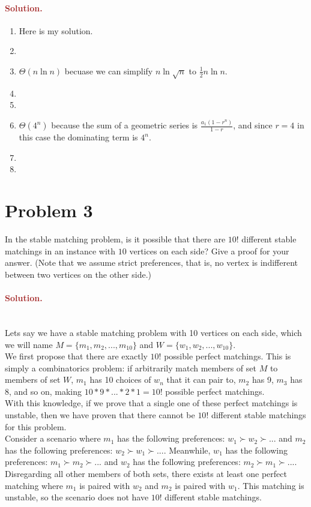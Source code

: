 \paragraph{\textcolor{brown}{Solution.}}
\begin{enumerate}
    \item Here is my solution.
    \item 
    \item $\Theta(n \ln n)$ becuase we can simplify $n \ln \sqrt{n}$ to $\frac{1}{2} n \ln n$.
    \item 
    \item
    \item $\Theta(4^n)$ because the sum of a geometric series is $\frac{a_1(1-r^n)}{1-r}$, and since $r = 4$ in this case the dominating term is $4^n$.
    \item 
    \item 
\end{enumerate}

\section*{Problem 3}
In the stable matching problem, is it possible that there are $10!$ different stable matchings in an instance with $10$ vertices on each side? Give a proof for your answer. (Note that we assume strict preferences, that is, no vertex is indifferent between two vertices on the other side.)

\paragraph{\textcolor{brown}{Solution.}} \: \\
Lets say we have a stable matching problem with 10 vertices on each side, which we will name $M=\{m_1, m_2, ..., m_{10}\}$ and $W=\{w_1, w_2, ..., w_{10}\}$. 
\\We first propose that there are exactly $10!$ possible perfect matchings. This is simply a combinatorics problem: if arbitrarily match members of set $M$ to members of set $W$, $m_1$ has 10 choices of $w_n$ that it can pair to, $m_2$ has 9, $m_3$ has 8, and so on, making $10*9*...*2*1=10!$ possible perfect matchings.
\\With this knowledge, if we prove that a single one of these perfect matchings is unstable, then we have proven that there cannot be $10!$ different stable matchings for this problem.
\\Consider a scenario where $m_1$ has the following preferences: $w_1 \succ w_2 \succ ...$ and $m_2$ has the following preferences: $w_2 \succ w_1 \succ ...$. Meanwhile, $w_1$ has the following preferences: $m_1 \succ m_2 \succ ...$ and $w_2$ has the following preferences: $m_2 \succ m_1 \succ ...$. Disregarding all other members of both sets, there exists at least one perfect matching where $m_1$ is paired with $w_2$ and $m_2$ is paired with $w_1$. This matching is unstable, so the scenario does not have $10!$ different stable matchings.

